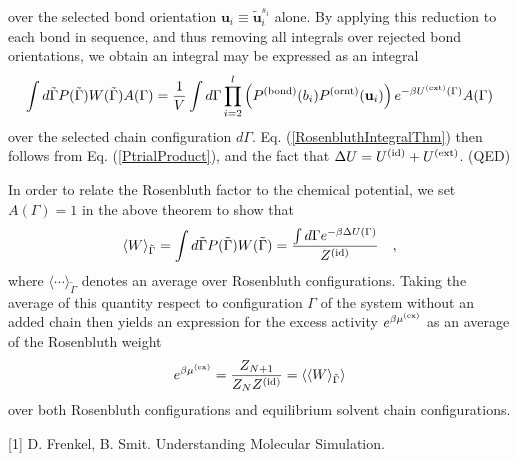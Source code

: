\documentclass[12pt]{article}
\newcommand{\vv}[1]{\mathbf{#1}}
\newcommand\chain{\Gamma}
\newcommand\delU{\Delta U}
\newcommand\Uid{U^{({\rm id})}}
\newcommand\Uext{U^{({\rm ext})}}
\newcommand\Ztot{Z_{N+1}}
\newcommand\Zsystem{Z_{N}}
\newcommand\Zid{Z^{({\rm id})}}
\newcommand\muex{\mu^{({\rm ex})}}
\newcommand\nbead{l}
\newcommand\ubond{\vv{u}}
\newcommand\rbond{b}
\newcommand\utrial{\tilde{\vv{u}}}
\newcommand\Pbond{P^{({\rm bond})}}
\newcommand\Pornt{P^{({\rm ornt})}}
\newcommand\zid{z^{({\rm id})}}
\newcommand\rconfig{\tilde{\chain}}
\begin{document}
over the selected bond orientation $\ubond_{i} \equiv \utrial_{i}^{s_{i}}$ alone. By applying this reduction to each bond in sequence, and thus removing all integrals over rejected bond orientations, we obtain an integral may be expressed as an integral
\begin{equation}
    \int d\rconfig P(\rconfig)W(\rconfig) A(\chain) = 
    \frac{1}{V} \int d\chain 
    \prod_{i=2}^{\nbead} \left ( \Pbond(\rbond_{i}) \Pornt(\ubond_{i}) \right )
    e^{-\beta\Uext(\chain)} A(\chain) 
\end{equation}
over the selected chain configuration $d\chain$. Eq. (\ref{RosenbluthIntegralThm}) then follows from Eq. (\ref{PtrialProduct}), and the fact that $\delU = \Uid + \Uext$. (QED)


In order to relate the Rosenbluth factor to the chemical potential, we set $A(\chain)=1$
in the above theorem to show that
\begin{equation}
    \langle W \rangle_{\rconfig} = \int d\rconfig P(\rconfig)W(\rconfig) = 
    \frac{\int d\chain e^{-\beta\delU(\chain)}}{\Zid} 
    \quad,
\end{equation}
where $\langle \cdots \rangle_{\rconfig}$ denotes an average over Rosenbluth configurations.
Taking the average of this quantity respect to configuration $\chain$ of the system without 
an added chain then yields an expression for the excess activity $e^{\beta\muex}$ as an 
average of the Rosenbluth weight
\begin{equation}
   e^{\beta \muex} = 
   \frac{\Ztot}{\Zsystem\Zid} = 
   \langle \langle W \rangle_{\rconfig} \rangle
\end{equation}
over both Rosenbluth configurations and equilibrium solvent chain configurations. 


\begin{thebibliography}{99} %

[1] D. Frenkel, B. Smit. Understanding Molecular Simulation. 
 
\end{thebibliography}

\end{document}
